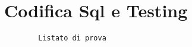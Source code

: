 \section{Codifica Sql e Testing} %
\label{sec:codifica_sql_e_testing}
	
	\begin{lstlisting}
		Listato di prova
	\end{lstlisting}